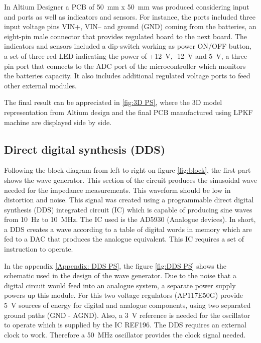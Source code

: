 In Altium Designer a PCB of \SI{50}{\milli\meter} x \SI{50}{\milli\meter} was produced considering input and ports as well as indicators and sensors. For instance, the ports included three input voltage pins VIN+, VIN– and ground (GND) coming from the batteries, an eight-pin male connector that provides regulated board to the next board. The indicators and sensors included a dip-switch working as power ON/OFF button, a set of three red-LED indicating the power of +\SI{12}{\volt}, -\SI{12}{\volt} and \SI{5}{\volt}, a three-pin port that connects to the ADC port of the microcontroller which monitors the batteries capacity. It also includes additional regulated voltage ports to feed other external modules.

The final result can be appreciated in \ref{fig:3D PS}, where the 3D model representation from Altium design and the final PCB manufactured using LPKF machine are displayed side by side. 


\subsection{Direct digital synthesis (DDS)}
\label{section DDS}
Following the block diagram from left to right on figure \ref{fig:block}, the first part shows the wave generator. This section of the circuit produces the sinusoidal wave needed for the impedance measurements. This waveform should be low in distortion and noise. This signal was created using a programmable direct digital synthesis (DDS) integrated circuit (IC) which is capable of producing sine waves from \SI{10}{\hertz} to \SI{10}{\mega\hertz}. The IC used is the AD5930 (Analogue devices). In short, a DDS creates a wave according to a table of digital words in memory which are fed to a DAC that produces the analogue equivalent. This IC requires a set of instruction to operate. 

In the appendix \ref{Appendix: DDS PS}, the figure \ref{fig:DDS PS} shows the schematic used in the design of the wave generator. Due to the noise that a digital circuit would feed into an analogue system, a separate power supply powers up this module. For this two voltage regulators (AP117E50G) provide \SI{5}{\volt} sources of energy for digital and analogue components, using two separated ground paths (GND - AGND). Also, a \SI{3}{\volt} reference is needed for the oscillator to operate which is supplied by the IC REF196. The DDS requires an external clock to work. Therefore a \SI{50}{\mega\hertz} oscillator provides the clock signal needed.

